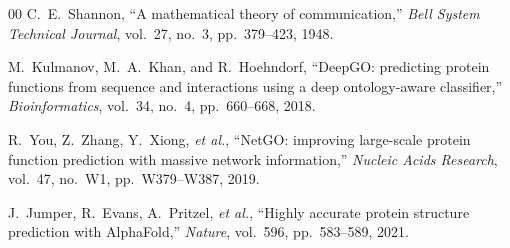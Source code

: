 \documentclass[conference]{IEEEtran}
\begin{document}
\begin{thebibliography}{00}
 C.~E.~Shannon, ``A mathematical theory of communication,'' \textit{Bell System Technical Journal}, vol.~27, no.~3, pp.~379--423, 1948.

 M.~Kulmanov, M.~A.~Khan, and R.~Hoehndorf, ``DeepGO: predicting protein functions from sequence and interactions using a deep ontology-aware classifier,'' \textit{Bioinformatics}, vol.~34, no.~4, pp.~660--668, 2018.

 R.~You, Z.~Zhang, Y.~Xiong, \textit{et al.}, ``NetGO: improving large-scale protein function prediction with massive network information,'' \textit{Nucleic Acids Research}, vol.~47, no.~W1, pp.~W379--W387, 2019.

 J.~Jumper, R.~Evans, A.~Pritzel, \textit{et al.}, ``Highly accurate protein structure prediction with AlphaFold,'' \textit{Nature}, vol.~596, pp.~583--589, 2021.

\end{thebibliography}
\end{document}
